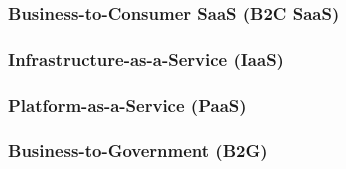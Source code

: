 \subsubsection{Business-to-Consumer SaaS (B2C SaaS)}

\subsubsection{Infrastructure-as-a-Service (IaaS)}

\subsubsection{Platform-as-a-Service (PaaS)}

\subsubsection{Business-to-Government (B2G)}